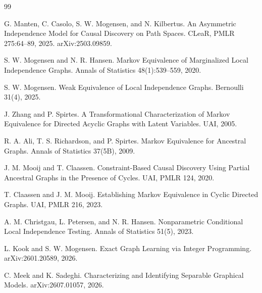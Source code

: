 \documentclass{article}
\begin{document}
\begin{thebibliography}{99}

   G. Manten, C. Casolo, S. W. Mogensen, and N. Kilbertus. An Asymmetric Independence Model for Causal Discovery on Path Spaces. CLeaR, PMLR 275:64--89, 2025. arXiv:2503.09859.

   S. W. Mogensen and N. R. Hansen. Markov Equivalence of Marginalized Local Independence Graphs. Annals of Statistics 48(1):539--559, 2020.

   S. W. Mogensen. Weak Equivalence of Local Independence Graphs. Bernoulli 31(4), 2025.

   J. Zhang and P. Spirtes. A Transformational Characterization of Markov Equivalence for Directed Acyclic Graphs with Latent Variables. UAI, 2005.

   R. A. Ali, T. S. Richardson, and P. Spirtes. Markov Equivalence for Ancestral Graphs. Annals of Statistics 37(5B), 2009.

   J. M. Mooij and T. Claassen. Constraint-Based Causal Discovery Using Partial Ancestral Graphs in the Presence of Cycles. UAI, PMLR 124, 2020.

   T. Claassen and J. M. Mooij. Establishing Markov Equivalence in Cyclic Directed Graphs. UAI, PMLR 216, 2023.

   A. M. Christgau, L. Petersen, and N. R. Hansen. Nonparametric Conditional Local Independence Testing. Annals of Statistics 51(5), 2023.

   L. Kook and S. W. Mogensen. Exact Graph Learning via Integer Programming. arXiv:2601.20589, 2026.

   C. Meek and K. Sadeghi. Characterizing and Identifying Separable Graphical Models. arXiv:2607.01057, 2026.

\end{thebibliography}
\end{document}
